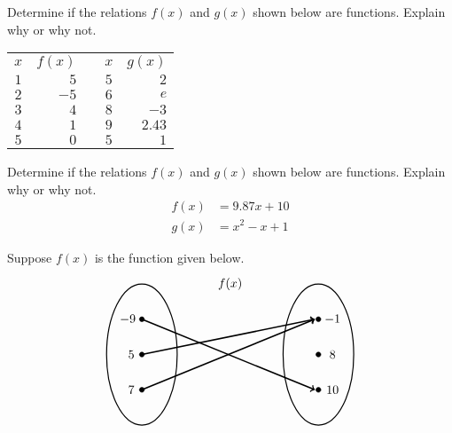 \documentclass[11pt,letterpaper]{article}
\begin{document}
 Determine if the relations $f(x)$ and $g(x)$ shown below are functions. Explain why or why not. 
	\begin{table}[!ht]
	\centering
	\begin{tabular}{c|rcc|r}
	$x$ & $f(x)$ & \hspace{1cm} & $x$ & $g(x)$ \\ \cline{1-2} \cline{4-5}
	$1$ & $5$ & & $5$ & $2$ \\
	$2$ & $-5$ & & $6$ & $e$ \\
	$3$ & $4$ & & $8$ & $-3$ \\
	$4$ & $1$ & & $9$ & $2.43$ \\
	$5$ & $0$ & & $5$ & $1$
	\end{tabular}
	\end{table}



\newpage



 Determine if the relations $f(x)$ and $g(x)$ shown below are functions. Explain why or why not. 
	\[
	\begin{aligned}
	f(x)&= 9.87x + 10 \\[0.3cm]
	g(x)&= x^2 - x + 1
	\end{aligned}
	\]



\newpage



 Suppose $f(x)$ is the function given below.
	\[
	\begin{tikzpicture}
	\node at (2.5,2) {$f(x)$};
	\draw[line width=0.03cm] (0,0) circle (1 and 2);
	\draw[line width=0.03cm] (5,0) circle (1 and 2);
	
	\draw[fill=black] (0,1) circle (0.07);
	\draw[fill=black] (0,0) circle (0.07);
	\draw[fill=black] (0,-1) circle (0.07);
	
	\draw[fill=black] (5,1) circle (0.07);
	\draw[fill=black] (5,0) circle (0.07);
	\draw[fill=black] (5,-1) circle (0.07);
	
	\draw[line width=0.04cm,->] (0,1) -- (4.9,-1);
	\draw[line width=0.04cm,->] (0,0) -- (4.9,1);
	\draw[line width=0.04cm,->] (0,-1) -- (4.9,1);
	
	\node at (-0.4,1) {$-9$};
	\node at (-0.3,0) {$5$};
	\node at (-0.3,-1) {$7$};
	
	\node at (5.4,1) {$-1$};
	\node at (5.4,0) {$8$};
	\node at (5.4,-1) {$10$};
	\end{tikzpicture}
	\]
\end{document}
